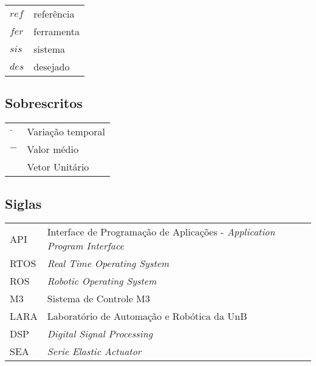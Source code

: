 \begin{tabular}{p{}p{}}
$ref$  & referência \tabularnewline
$fer$  & ferramenta \tabularnewline
$sis$  & sistema \tabularnewline
$des$  & desejado\tabularnewline
\end{tabular}


\subsection*{Sobrescritos}

\begin{tabular}{p{}p{}}
$\cdot$  & Variação temporal \tabularnewline
$-$  & Valor médio \tabularnewline
$^{}$  & Vetor Unitário \tabularnewline
\end{tabular}


\subsection*{Siglas}

\begin{tabular}{p{}p{}}
API & Interface de Programação de Aplicações - \textit{Application Program Interface}\tabularnewline
RTOS & \textit{Real Time Operating System}\tabularnewline
ROS & \textit{Robotic Operating System}\tabularnewline
M3 & Sistema de Controle M3\tabularnewline
LARA & Laboratório de Automação e Robótica da UnB\tabularnewline
DSP & \textit{Digital Signal Processing}\tabularnewline
SEA & \textit{Serie Elastic Actuator}\tabularnewline
\end{tabular}
